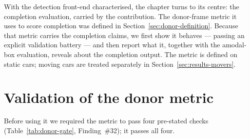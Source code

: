 %
%
With the detection front-end characterised, the chapter turns to its centre: the
completion evaluation, carried by the contribution. The donor-frame metric it uses
to score completion was defined in Section~\ref{sec:donor-definition}. Because that
metric carries the completion claims, we first show it behaves --- passing an
explicit validation battery --- and then report what it, together with the
amodal-box evaluation, reveals about the completion output. The metric is defined
on static cars; moving cars are treated separately in
Section~\ref{sec:results-movers}.

\section{Validation of the donor metric}
\label{sec:donor-validation}

Before using it we required the metric to pass four pre-stated checks
(Table~\ref{tab:donor-gate}, Finding~\#32); it passes all four.

